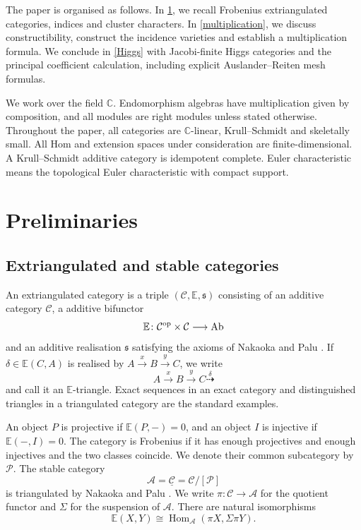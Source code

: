 \documentclass[11pt,reqno]{article}
\numberwithin{equation}{section}
\theoremstyle{definition}
\DeclareMathOperator{\Hom}{Hom}
\newcommand{\C}{\mathcal C}
\newcommand{\A}{\mathcal A}
\newcommand{\Pcal}{\mathcal P}
\newcommand{\E}{\mathbb E}
\newcommand{\kk}{\mathbb C}
\newcommand{\xto}[1]{\xrightarrow{#1}}
\newcommand{\etri}{\dashrightarrow}
\begin{document}
The paper is organised as follows.  In \cref{sec:background}, we recall Frobenius extriangulated categories, indices and cluster characters.   In \cref{multiplication}, we discuss constructibility, construct the incidence varieties and establish a multiplication formula.  We conclude in \cref{Higgs} with Jacobi-finite Higgs categories and the principal coefficient calculation, including explicit Auslander--Reiten mesh formulas.

We work over the field $\mathbb C$.  Endomorphism algebras have multiplication given by composition, and all modules are right modules unless stated otherwise. Throughout the paper, all categories are $\kk$-linear, Krull--Schmidt and skeletally small.  All Hom and extension spaces under consideration are finite-dimensional.  A Krull--Schmidt additive category is idempotent complete. Euler characteristic means the topological Euler characteristic with compact support.

\section{Preliminaries}\label{sec:background}



\subsection{Extriangulated and stable categories}

An extriangulated category is a triple $(\C,\E,\mathfrak s)$ consisting of an additive category $\C$, a additive bifunctor
\[
 \E\colon\C^{\mathrm{op}}\times\C\longrightarrow {\rm Ab}
\]
and an additive realisation $\mathfrak s$ satisfying the axioms of Nakaoka and Palu \cite{NakaokaPalu}.  If $\delta\in\E(C,A)$ is realised by $A\xto{x}B\xto{y}C$, we write
\[
 A\xto{x}B\xto{y}C\overset{\delta}{\etri}
\]
and call it an $\E$-triangle.  Exact sequences in an exact category and distinguished triangles in a triangulated category are the standard examples.

An object $P$ is projective if $\E(P,-)=0$, and an object $I$ is injective if $\E(-,I)=0$.  The category is Frobenius if it has enough projectives and enough injectives and the two classes coincide.  We denote their common subcategory by $\Pcal$.  The stable category
\[
 \A=\underline{\C}=\C/[\Pcal]
\]
is triangulated by Nakaoka and Palu \cite{NakaokaPalu}.  We write $\pi\colon\C\to\A$ for the quotient functor and $\Sigma$ for the suspension of $\A$.  There are natural isomorphisms
\[
 \E(X,Y)\cong\Hom_{\A}(\pi X,\Sigma\pi Y).
\]
\end{document}
